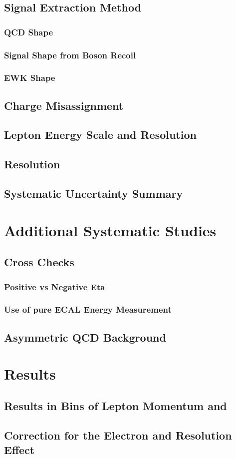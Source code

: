 \subsection{Signal Extraction Method}
\subsubsection{QCD \ETm Shape}
\subsubsection{Signal \ETm Shape from Boson Recoil}
\subsubsection{EWK \ETm Shape}
\subsection{Charge Misassignment}
\subsection{Lepton Energy Scale and Resolution}
\subsection{\ETm Resolution}
\subsection{Systematic Uncertainty Summary}

\section{Additional Systematic Studies}
\subsection{Cross Checks}
\subsubsection{Positive vs Negative Eta}
\subsubsection{Use of pure ECAL Energy Measurement}
\subsection{Asymmetric QCD Background}

\section{Results}
\subsection{Results in Bins of Lepton Momentum and \ETm}
\subsection{Correction for the Electron and \ETm Resolution Effect}


